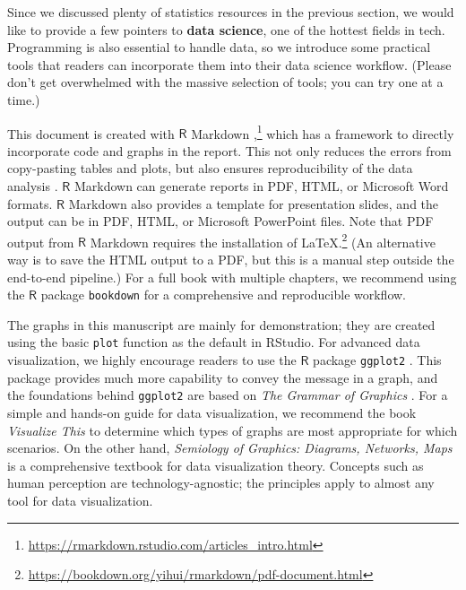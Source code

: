 \documentclass[
]{article}
\begin{document}
Since we discussed plenty of statistics resources in the previous
section, we would like to provide a few pointers to \textbf{data
science}, one of the hottest fields in tech. Programming is also
essential to handle data, so we introduce some practical tools that
readers can incorporate them into their data science workflow. (Please
don't get overwhelmed with the massive selection of tools; you can try
one at a time.)

This document is created with \(\mathsf{R}\) Markdown
\citep{r-markdown-pkg},\footnote{\url{https://rmarkdown.rstudio.com/articles_intro.html}}
which has a framework to directly incorporate code and graphs in the
report. This not only reduces the errors from copy-pasting tables and
plots, but also ensures reproducibility of the data analysis
\citep{baumer2014r-markdown}. \(\mathsf{R}\) Markdown can generate
reports in PDF, HTML, or Microsoft Word formats. \(\mathsf{R}\) Markdown
also provides a template for presentation slides, and the output can be
in PDF, HTML, or Microsoft PowerPoint files. Note that PDF output from
\(\mathsf{R}\) Markdown requires the installation of LaTeX.\footnote{\url{https://bookdown.org/yihui/rmarkdown/pdf-document.html}}
(An alternative way is to save the HTML output to a PDF, but this is a
manual step outside the end-to-end pipeline.) For a full book with
multiple chapters, we recommend using the \(\mathsf{R}\) package
\texttt{bookdown} \citep{r-bookdown} for a comprehensive and
reproducible workflow.

The graphs in this manuscript are mainly for demonstration; they are
created using the basic \texttt{plot} function as the default in
RStudio. For advanced data visualization, we highly encourage readers to
use the \(\mathsf{R}\) package \texttt{ggplot2} \citep{ggplot2}. This
package provides much more capability to convey the message in a graph,
and the foundations behind \texttt{ggplot2} are based on \emph{The
Grammar of Graphics} \citep{wilkinson2013grammar}. For a simple and
hands-on guide for data visualization, we recommend the book
\emph{Visualize This} \citep{yau2011visualize} to determine which types
of graphs are most appropriate for which scenarios. On the other hand,
\emph{Semiology of Graphics: Diagrams, Networks, Maps}
\citep{bertin1983semiology} is a comprehensive textbook for data
visualization theory. Concepts such as human perception are
technology-agnostic; the principles apply to almost any tool for data
visualization.
\end{document}
